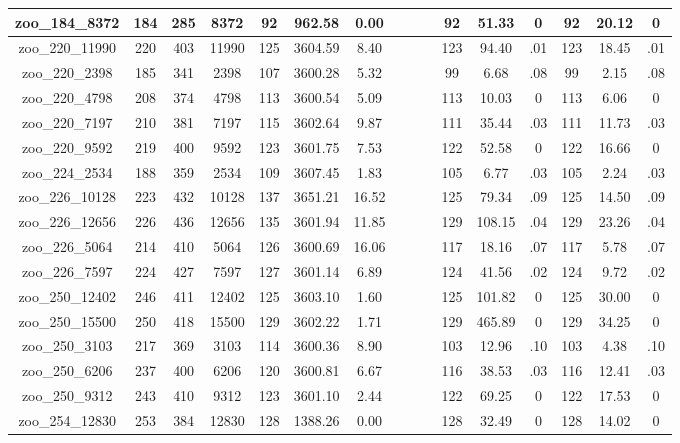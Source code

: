 \begin{landscape}
\begin{longtable}{|c|c|c|c|c|c|c|c|c|c|c|c|c|c|c|c|}
zoo\_184\_8372 & 184 & 285 & 8372 & 92 & 962.58 & 0.00 &  &  &  & 92 & 51.33 & 0 & 92 & 20.12 & 0 \\ \hline 
zoo\_220\_11990 & 220 & 403 & 11990 & 125 & 3604.59 & 8.40 &  &  &  & 123 & 94.40 & .01 & 123 & 18.45 & .01 \\ \hline 
zoo\_220\_2398 & 185 & 341 & 2398 & 107 & 3600.28 & 5.32 &  &  &  & 99 & 6.68 & .08 & 99 & 2.15 & .08 \\ \hline 
zoo\_220\_4798 & 208 & 374 & 4798 & 113 & 3600.54 & 5.09 &  &  &  & 113 & 10.03 & 0 & 113 & 6.06 & 0 \\ \hline 
zoo\_220\_7197 & 210 & 381 & 7197 & 115 & 3602.64 & 9.87 &  &  &  & 111 & 35.44 & .03 & 111 & 11.73 & .03 \\ \hline 
zoo\_220\_9592 & 219 & 400 & 9592 & 123 & 3601.75 & 7.53 &  &  &  & 122 & 52.58 & 0 & 122 & 16.66 & 0 \\ \hline 
zoo\_224\_2534 & 188 & 359 & 2534 & 109 & 3607.45 & 1.83 &  &  &  & 105 & 6.77 & .03 & 105 & 2.24 & .03 \\ \hline 
zoo\_226\_10128 & 223 & 432 & 10128 & 137 & 3651.21 & 16.52 &  &  &  & 125 & 79.34 & .09 & 125 & 14.50 & .09 \\ \hline 
zoo\_226\_12656 & 226 & 436 & 12656 & 135 & 3601.94 & 11.85 &  &  &  & 129 & 108.15 & .04 & 129 & 23.26 & .04 \\ \hline 
zoo\_226\_5064 & 214 & 410 & 5064 & 126 & 3600.69 & 16.06 &  &  &  & 117 & 18.16 & .07 & 117 & 5.78 & .07 \\ \hline 
zoo\_226\_7597 & 224 & 427 & 7597 & 127 & 3601.14 & 6.89 &  &  &  & 124 & 41.56 & .02 & 124 & 9.72 & .02 \\ \hline 
zoo\_250\_12402 & 246 & 411 & 12402 & 125 & 3603.10 & 1.60 &  &  &  & 125 & 101.82 & 0 & 125 & 30.00 & 0 \\ \hline 
zoo\_250\_15500 & 250 & 418 & 15500 & 129 & 3602.22 & 1.71 &  &  &  & 129 & 465.89 & 0 & 129 & 34.25 & 0 \\ \hline 
zoo\_250\_3103 & 217 & 369 & 3103 & 114 & 3600.36 & 8.90 &  &  &  & 103 & 12.96 & .10 & 103 & 4.38 & .10 \\ \hline 
zoo\_250\_6206 & 237 & 400 & 6206 & 120 & 3600.81 & 6.67 &  &  &  & 116 & 38.53 & .03 & 116 & 12.41 & .03 \\ \hline 
zoo\_250\_9312 & 243 & 410 & 9312 & 123 & 3601.10 & 2.44 &  &  &  & 122 & 69.25 & 0 & 122 & 17.53 & 0 \\ \hline 
zoo\_254\_12830 & 253 & 384 & 12830 & 128 & 1388.26 & 0.00 &  &  &  & 128 & 32.49 & 0 & 128 & 14.02 & 0 \\ \hline 

\end{longtable}
\end{landscape}

